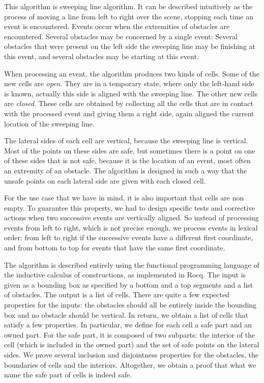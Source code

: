 \documentclass[a4paper, USenglish, cleveref, autoref, thm-restate]{lipics-v2021}
\begin{document}
This algorithm is sweeping line algorithm.  It can be described
intuitively as the process of moving a line from left to right over
the scene, stopping each time an event is encountered.
Events occur when the extremities of obstacles are encountered.
Several obstacles may be concerned by a single event: Several
obstacles that were present on the left side the sweeping line may be
finishing at this event, and several obstacles may be starting at this
event.

When processing an event, the algorithm produces two kinds of cells.
Some of the new cells are {\em open}.  They are in a temporary state,
where only the left-hand side is known, actually this side is aligned
with the sweeping line.  The other new cells are {\em closed}.  These
cells are obtained by collecting all the cells that are in contact
with the processed event and giving them a right side, again aligned
the current location of the sweeping line.

The lateral sides of each cell are vertical, because the sweeping line
is vertical.  Most of the points on these sides are safe, but
sometimes there is a point on one of these sides that is not safe,
because it is the location of an event, most often an extremity of an
obstacle.  The algorithm is designed in such a way that the unsafe
points on each lateral side are given with each closed cell.

For the use case that we have in mind, it is also important that cells
are non empty.  To guarantee this property, we had to design specific
tests and corrective actions when two successive events are vertically
aligned.  So instead of processing events from left to right, which is
not precise enough, we process events in lexical order: from left to
right if the successive events have a different first coordinate, and
from bottom to top for events that have the same first coordinate.

The algorithm is described entirely using the functional programming
language of the inductive calculus of constructions, as implemented in
Rocq.  The input is given as a bounding box as specified by a bottom and
a top segments and a list of obstacles.
The output is a list of cells.  There are quite a few expected
properties for the inputs: the obstacles should all be entirely inside
the bounding box and no obstacle should be vertical.  In return, we
obtain a list of cells that satisfy a few properties.  In particular,
we define for each cell a safe part and an owned part.  For the safe part,
it is composed of two subparts: the interior of the cell (which is included in
the owned part) and the set of safe points on the lateral sides.  We
prove several inclusion and disjointness properties for the obstacles, the
boundaries of cells and the interiors.  Altogether, we obtain a proof that
what we name the safe part of cells is indeed safe.
\end{document}
